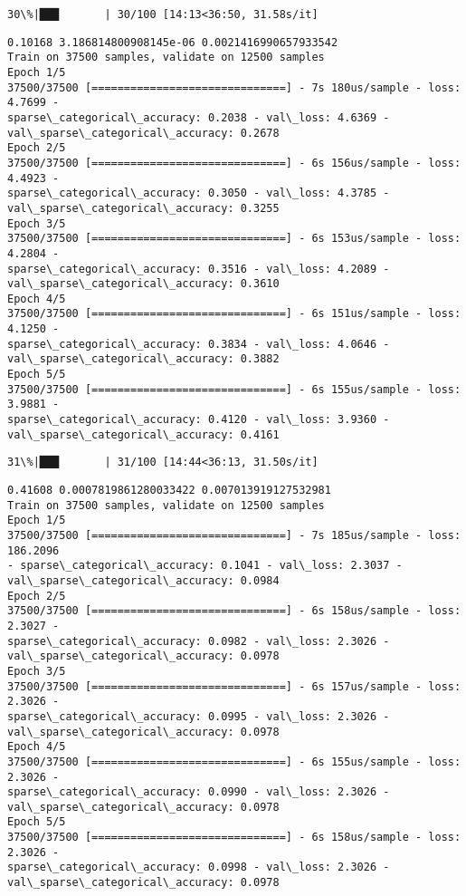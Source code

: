 \documentclass[11pt]{article}
\begin{document}
    \begin{Verbatim}[commandchars=\\\{\}]
 30\%|███       | 30/100 [14:13<36:50, 31.58s/it]
    \end{Verbatim}

    \begin{Verbatim}[commandchars=\\\{\}]
0.10168 3.186814800908145e-06 0.0021416990657933542
Train on 37500 samples, validate on 12500 samples
Epoch 1/5
37500/37500 [==============================] - 7s 180us/sample - loss: 4.7699 -
sparse\_categorical\_accuracy: 0.2038 - val\_loss: 4.6369 -
val\_sparse\_categorical\_accuracy: 0.2678
Epoch 2/5
37500/37500 [==============================] - 6s 156us/sample - loss: 4.4923 -
sparse\_categorical\_accuracy: 0.3050 - val\_loss: 4.3785 -
val\_sparse\_categorical\_accuracy: 0.3255
Epoch 3/5
37500/37500 [==============================] - 6s 153us/sample - loss: 4.2804 -
sparse\_categorical\_accuracy: 0.3516 - val\_loss: 4.2089 -
val\_sparse\_categorical\_accuracy: 0.3610
Epoch 4/5
37500/37500 [==============================] - 6s 151us/sample - loss: 4.1250 -
sparse\_categorical\_accuracy: 0.3834 - val\_loss: 4.0646 -
val\_sparse\_categorical\_accuracy: 0.3882
Epoch 5/5
37500/37500 [==============================] - 6s 155us/sample - loss: 3.9881 -
sparse\_categorical\_accuracy: 0.4120 - val\_loss: 3.9360 -
val\_sparse\_categorical\_accuracy: 0.4161
    \end{Verbatim}

    \begin{Verbatim}[commandchars=\\\{\}]
 31\%|███       | 31/100 [14:44<36:13, 31.50s/it]
    \end{Verbatim}

    \begin{Verbatim}[commandchars=\\\{\}]
0.41608 0.0007819861280033422 0.007013919127532981
Train on 37500 samples, validate on 12500 samples
Epoch 1/5
37500/37500 [==============================] - 7s 185us/sample - loss: 186.2096
- sparse\_categorical\_accuracy: 0.1041 - val\_loss: 2.3037 -
val\_sparse\_categorical\_accuracy: 0.0984
Epoch 2/5
37500/37500 [==============================] - 6s 158us/sample - loss: 2.3027 -
sparse\_categorical\_accuracy: 0.0982 - val\_loss: 2.3026 -
val\_sparse\_categorical\_accuracy: 0.0978
Epoch 3/5
37500/37500 [==============================] - 6s 157us/sample - loss: 2.3026 -
sparse\_categorical\_accuracy: 0.0995 - val\_loss: 2.3026 -
val\_sparse\_categorical\_accuracy: 0.0978
Epoch 4/5
37500/37500 [==============================] - 6s 155us/sample - loss: 2.3026 -
sparse\_categorical\_accuracy: 0.0990 - val\_loss: 2.3026 -
val\_sparse\_categorical\_accuracy: 0.0978
Epoch 5/5
37500/37500 [==============================] - 6s 158us/sample - loss: 2.3026 -
sparse\_categorical\_accuracy: 0.0998 - val\_loss: 2.3026 -
val\_sparse\_categorical\_accuracy: 0.0978
    \end{Verbatim}
\end{document}

